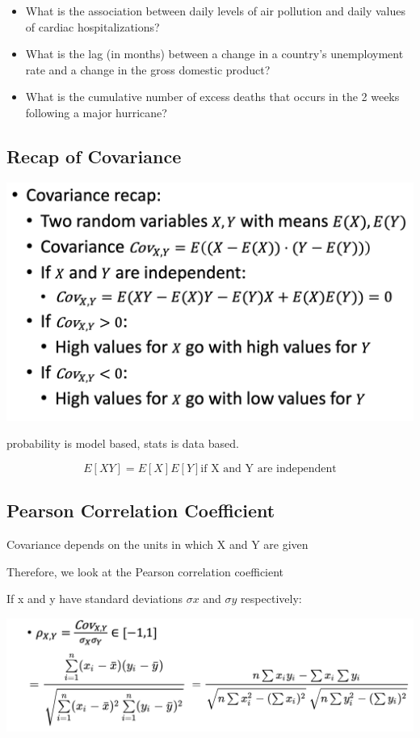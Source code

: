 \documentclass[11pt]{article}
\theoremstyle{definition}
\begin{document}
\begin{itemize}
  \item What is the association between daily levels of air pollution and daily
  values of cardiac hospitalizations?
  \item What is the lag (in months) between a change in a country’s
  unemployment rate and a change in the gross domestic product?
  \item What is the cumulative number of excess deaths that occurs in the 2
  weeks following a major hurricane?
\end{itemize}

\subsection{Recap of Covariance}
\includegraphics[width=\textwidth/2]{5.png}

probability is model based, stats is data based.

\begin{equation}
  E[XY] = E[X]E[Y] \text{if X and Y are independent}
\end{equation}

\subsection{Pearson Correlation Coefficient}
Covariance depends on the units in which X and Y are given

Therefore, we look at the Pearson correlation coefficient

If x and y have standard deviations $\sigma x$ and $\sigma y$ respectively:

\includegraphics[width=\textwidth/2]{6.png}
\end{document}
